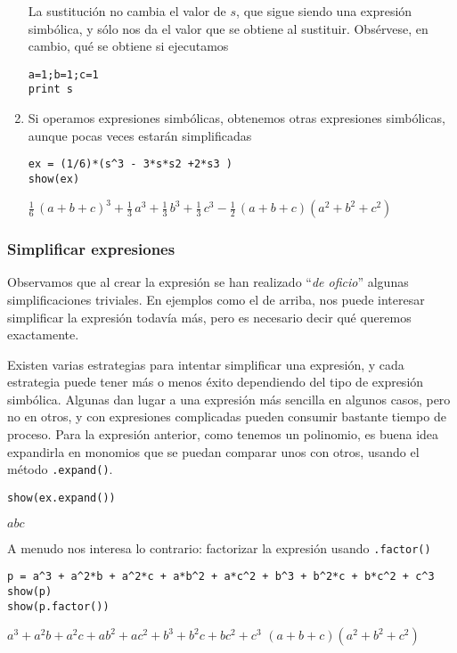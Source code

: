 \begin{enumerate}
La sustituci\'on no cambia el valor de $s$, que sigue siendo una expresi\'on 
simb\'olica, y s\'olo nos da el valor que se obtiene al sustituir. 
Obsérvese, en cambio, qué se obtiene si ejecutamos
\begin{lstlisting}[numbers=none]
a=1;b=1;c=1
print s
\end{lstlisting}

\item Si operamos expresiones simbólicas, obtenemos otras expresiones
simbólicas,
aunque pocas veces estarán simplificadas
\begin{lstlisting}[numbers=none]
ex = (1/6)*(s^3 - 3*s*s2 +2*s3 )
show(ex)
\end{lstlisting}
\begin{Output}
	$\frac{1}{6} \, {\left(a + b + c\right)}^{3} + \frac{1}{3} \, a^{3} +
	\frac{1}{3} \, b^{3} + \frac{1}{3} \, c^{3} - \frac{1}{2} \, {\left(a +
	b + c\right)} {\left(a^{2} + b^{2} + c^{2}\right)}$
\end{Output}
\end{enumerate}
\subsubsection{Simplificar expresiones}

Observamos que
al crear la expresión se han realizado ``\emph{de oficio}'' algunas
simplificaciones
triviales. En ejemplos como el de arriba, nos puede interesar simplificar la
expresión
todavía más, pero es necesario decir qué queremos exactamente.

\smallskip

Existen varias estrategias
para intentar simplificar una expresión, y cada estrategia puede tener más o
menos éxito
dependiendo del tipo de expresión simbólica. Algunas dan lugar a una expresión
más sencilla en algunos casos, pero no en otros, y con expresiones complicadas
pueden
consumir bastante tiempo de proceso.
\label{expand}
Para la expresión anterior, como tenemos un polinomio, es buena idea expandirla
en
monomios que se puedan comparar unos con otros, usando el método 
\lstinline|.expand()|.

\begin{lstlisting}[numbers=none]
show(ex.expand())
\end{lstlisting}
\begin{Output}
	$abc$
\end{Output}
\pagebreak[3]

A menudo nos interesa lo contrario: factorizar la expresión usando
\lstinline|.factor()|
\begin{lstlisting}[numbers=none]
p = a^3 + a^2*b + a^2*c + a*b^2 + a*c^2 + b^3 + b^2*c + b*c^2 + c^3
show(p)
show(p.factor())
\end{lstlisting}
\begin{Output}
	$a^{3}+a^{2}b+a^{2}c+ab^{2}+ac^{2}+b^{3}+b^{2}c+bc^{2}+c^{3}$
	${\left(a+b+c\right)}{\left(a^{2}+b^{2}+c^{2}\right)}$
\end{Output}

